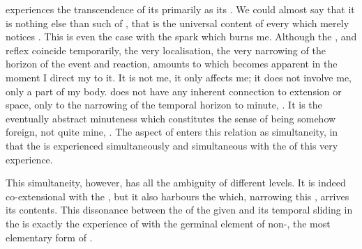 \pa {} experiences the transcendence of its 
primarily as its .  We could almost say that it is nothing else
than such  of , that  is the
universal content of every  which merely notices .
This is even the case with the spark which burns me. Although the ,
 and {reflex} coincide temporarily, the very localisation, the very
narrowing of the horizon of the event and reaction, amounts to
 which becomes apparent in the moment I direct my
 to it. It is not me, it only affects me; it does not
involve me, only a part of my body.  does not have any
inherent connection to extension or space, only to the narrowing of the temporal
horizon to  minute, . It is the eventually
abstract minuteness which constitutes the sense of being somehow foreign, not
quite mine, . The aspect of  enters this relation as
simultaneity, in that the  is experienced simultaneously and
 simultaneous with the  of this very experience.

This simultaneity, however, has all the ambiguity of different levels. It is
indeed co-extensional with the \hoa, but it also harbours the  which, narrowing this , arrives  its contents. This
dissonance between the  of the given  and its temporal
sliding in the  is exactly the experience of
 with the germinal element of non-, the most
elementary form of .


